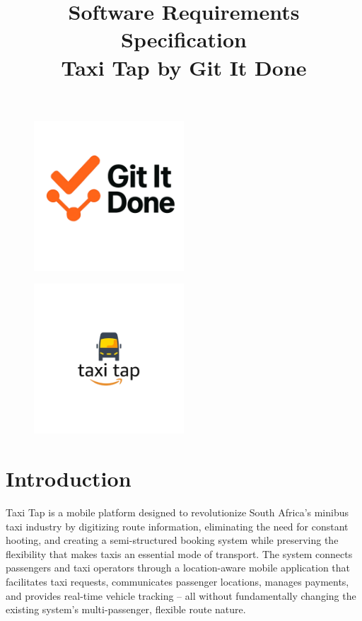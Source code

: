 \documentclass[a4paper,12pt]{article}
\title{Software Requirements Specification\\Taxi Tap by Git It Done}
\date{}
\begin{document}
\maketitle

\begin{figure}[H]
  \centering
  \includegraphics[width=0.5\textwidth]{LogoGroup.png} 
\end{figure}

\begin{figure}[H]
  \centering
  \includegraphics[width=0.5\textwidth]{LogoTaxiTap.png} 
\end{figure}

\newpage

\tableofcontents
\newpage

\section{Introduction}
Taxi Tap is a mobile platform designed to revolutionize South Africa’s minibus taxi industry by digitizing route information, eliminating the need for constant hooting, and creating a semi-structured booking system while preserving the flexibility that makes taxis an essential mode of transport. The system connects passengers and taxi operators through a location-aware mobile application that facilitates taxi requests, communicates passenger locations, manages payments, and provides real-time vehicle tracking – all without fundamentally changing the existing system's multi-passenger, flexible route nature.
\end{document}
